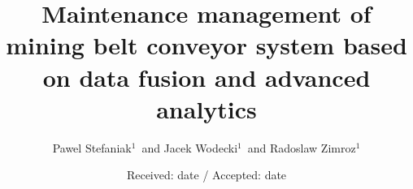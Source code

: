 \smartqed  %
%
\usepackage{graphicx}
%
%
%
%


\title{Maintenance management of mining belt conveyor system based on data fusion and advanced analytics}

\author{Pawel Stefaniak$^{1}$\ and Jacek Wodecki$^{1}$\ and Radoslaw Zimroz$^{1}$}



\date{Received: date / Accepted: date}

\maketitle


